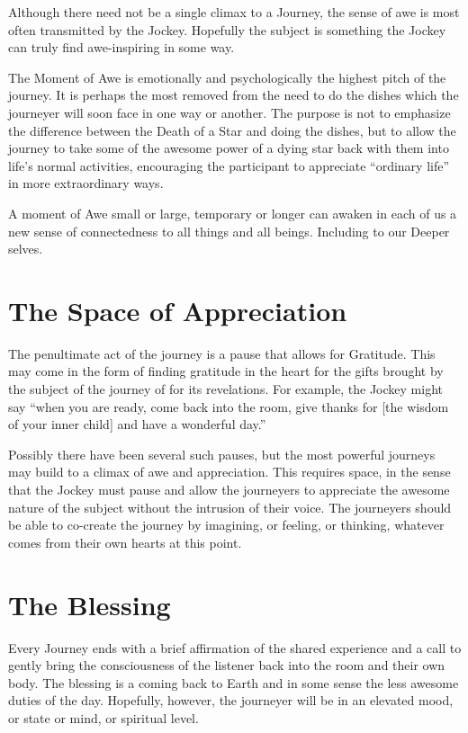 \documentclass[12pt]{book}
\begin{document}
Although there need not be a single climax to a Journey, the sense of awe is most often transmitted by the Jockey. Hopefully the subject is something the Jockey can truly find awe-inspiring in some way.
					
The Moment of Awe is emotionally and psychologically the highest pitch of the journey. It is perhaps the most removed from the need to do the dishes which the journeyer will soon face in one way or another. The purpose is not to emphasize the difference between the Death of a Star and doing the dishes, but to allow the journey to take some of the awesome power of a dying star back with them into life’s normal activities, encouraging the participant to appreciate “ordinary life” in more extraordinary ways.

A moment of Awe  small or large, temporary or longer can awaken in each of us a new sense of connectedness to all things and all beings. Including to our Deeper selves.
					
\section{The Space of Appreciation}
					
The penultimate act of the journey is a pause that allows for Gratitude.  This may come in the form of finding gratitude in the heart for the gifts brought by the subject of the journey of for its revelations. For example, the Jockey might say “when you are ready, come back into the room, give thanks for [the wisdom of your inner child] and have a wonderful day.”

Possibly there have been several such pauses, but the most powerful journeys may build to a climax of awe and appreciation. This requires space, in the sense that the Jockey must pause and allow the journeyers to appreciate the awesome nature of the subject without the intrusion of their voice. The journeyers should be able to co-create the journey by imagining, or feeling, or thinking, whatever comes from their own hearts at this point.

\section{The Blessing}
					
Every Journey ends with a brief affirmation of the shared experience and a call to gently bring the consciousness of the listener back into the room and their own body. The blessing is a coming back to Earth and in some sense the less awesome duties of the day. Hopefully, however, the journeyer will be in an elevated mood, or state or mind, or spiritual level.
					
\end{document}

